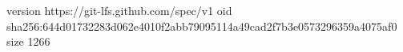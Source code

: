 version https://git-lfs.github.com/spec/v1
oid sha256:644d01732283d062e4010f2abb79095114a49cad2f7b3e0573296359a4075af0
size 1266
